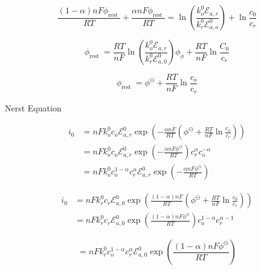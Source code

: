 \documentclass[lettersize,journal]{IEEEtran}
\begin{document}
\begin{equation}
  \frac{(1-\alpha) n F \phi_{\text {rest }}}{R T}+\frac{\alpha n F \phi_{\text {rest }}}{R T} =\ln \left(\frac{k_{o}^{0} \mathscr{E}_{a, r}}{k_{r}^{0} \mathscr{E}_{a, o}^{0}}\right)+\ln \frac{c_{0}}{c_{r}}
\end{equation}


\begin{equation}
  \phi_{\text {rest }} =\frac{R T}{n F} \ln \left(\frac{k_{o}^{0} \mathscr{E}_{a, r}}{k_{r}^{0} \mathscr{E}_{a, 0}^{0}}\right){\phi_{\phi}+\frac{R T}{n F} \ln \frac{C_{0}}{c_{r}}}
\end{equation}

\begin{equation}
\phi_{\text {rest }} =\phi^{\ominus}+\frac{R T}{n F} \ln \frac{c_{o}}{c_{r}}
\end{equation}

\noindent Nerst Equation

\begin{equation}
\begin{aligned}
i_{0} &=n F k_{o}^{0} c_{o} \mathscr{E}_{a, r}^{0} \exp \left(-\frac{\alpha n F}{R T}\left(\phi^{\ominus}+\frac{R T}{n F} \ln \frac{c_{o}}{c_{r}}\right)\right) \\
&=n F k_{o}^{0} c_{o} \mathscr{E}_{a, r}^{0} \exp \left(-\frac{\alpha n F \phi^{\ominus}}{R T}\right) c_{r}^{\alpha} c_{o}^{-\alpha} \\
&=n F k_{o}^{0} c_{o}^{1-\alpha} c_{r}^{\alpha} \mathscr{E}_{a, r}^{0} \exp \left(-\frac{\alpha n F \phi^{\ominus}}{R T}\right)
\end{aligned}
\end{equation}

\begin{equation}
\begin{aligned}
i_{0} &=n F k_{r}^{0} c_{r} \mathscr{E}_{a, 0}^{0} \exp \left(\frac{(1-\alpha) n F}{R T}\left(\phi^{\ominus}+\frac{R T}{n F} \ln \frac{c_{0}}{c_{r}}\right)\right) \\
&=n F k_{r}^{0} c_{r} \mathscr{E}_{a, 0}^{0} \exp \left(\frac{(1-\alpha) n F \phi^{\ominus}}{R T}\right) c_{o}^{1-\alpha} c_{r}^{\alpha-1}
\end{aligned}
\end{equation}

\begin{equation}
=n F k_{r}^{0} c_{o}^{1-\alpha} c_{r}^{\alpha} \mathscr{E}_{a, 0}^{0} \exp \left(\frac{(1-\alpha) n F \phi^{\ominus}}{R T}\right)
\end{equation}
\end{document}
